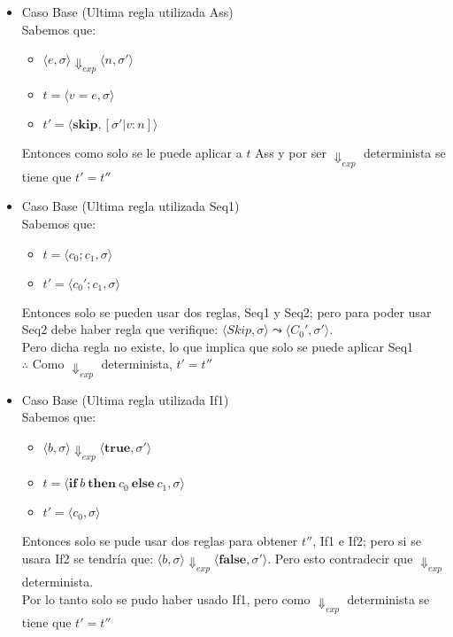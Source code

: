 \documentclass[12pt, titlepage]{article}
\renewcommand{\skip}{\textbf{skip}}
\newcommand{\true}{\textbf{true}}
\newcommand{\false}{\textbf{false}}
\begin{document}
\begin{itemize}[label=$\bullet$]

\item {Caso Base (Ultima regla utilizada Ass)}
    \\Sabemos que:
    \begin{itemize}[label=$\bullet$]
        \item {$\langle e, \sigma \rangle \Downarrow_{exp} \langle n, \sigma' \rangle$}
        \item {$t = \langle v=e, \sigma \rangle$}
        \item {$t' = \langle \skip, [\sigma' | v : n] \rangle$}
    \end{itemize}
    Entonces como solo se le puede aplicar a $t$ Ass y por ser $\Downarrow_{exp}$ determinista se tiene
    que $t' = t''$

\item {Caso Base (Ultima regla utilizada Seq1)}
    \\Sabemos que:
    \begin{itemize}[label=$\bullet$]
        \item {$t = \langle c_0;c_1, \sigma \rangle$}
        \item {$t' = \langle c_0';c_1, \sigma  \rangle$}
    \end{itemize}
    Entonces solo se pueden usar dos reglas, Seq1 y Seq2; pero para poder usar
    Seq2 debe haber regla que verifique: $\langle Skip,\sigma \rangle \leadsto \langle C_0',\sigma' \rangle$.\\
    Pero dicha regla no existe, lo que implica que solo se puede aplicar Seq1\\
    $\therefore$ Como $\Downarrow_{exp} $ determinista, $t' = t''$

\item {Caso Base (Ultima regla utilizada If1)}
    \\Sabemos que:
    \begin{itemize}[label=$\bullet$]
        \item {$\langle b, \sigma \rangle \Downarrow_{exp} \langle \true, \sigma' \rangle$}
        \item {$t = \langle \textbf{if} \:b \:\textbf{then} \:c_0 \:\textbf{else} \:c_1, \sigma \rangle$}
        \item {$t' = \langle c_0, \sigma  \rangle$}
    \end{itemize}
    Entonces solo se pude usar dos reglas para obtener $t''$, If1 e If2; pero si se usara If2
    se tendría que: $\langle b, \sigma \rangle \Downarrow_{exp} \langle \false, \sigma' \rangle$.
    Pero esto contradecir que $\Downarrow_{exp}$ determinista.
    \\Por lo tanto solo se pudo haber usado If1, pero como $\Downarrow_{exp}$ determinista se tiene que
    $t' = t''$     
         

\end{itemize}
\end{document}

